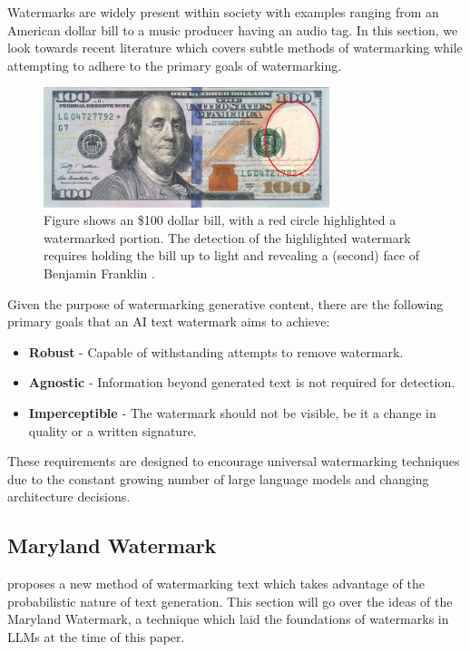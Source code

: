 \documentclass{l4proj}
\theoremstyle{definition}
\begin{document}
    Watermarks are widely present within society with examples ranging from an American dollar bill to a music producer having an audio tag. In this section, we look towards recent literature which covers subtle methods of watermarking while attempting to adhere to the primary goals of watermarking.

    \begin{figure}[ht]
        \centering
        \includegraphics[height=3.5cm, width=1\linewidth, keepaspectratio]{images/background/dbill-highlighted.png}
        \caption{Figure shows an \$100 dollar bill, with a red circle highlighted a watermarked portion. The detection of the highlighted watermark requires holding the bill up to light and revealing a (second) face of Benjamin Franklin \citep{bep2013dollar}.}
         \label{fig:dbill-watermark} 
    \end{figure}
         
    Given the purpose of watermarking generative content, there are the following primary goals that an AI text watermark aims to achieve:
    \begin{itemize}
        \setlength\itemsep{0.5em}
        \item \textbf{Robust} - Capable of withstanding attempts to remove watermark.
        \item \textbf{Agnostic} - Information beyond generated text is not required for detection.
        \item \textbf{Imperceptible} - The watermark should not be visible, be it a change in quality or a written signature.
    \end{itemize}

    These requirements are designed to encourage universal watermarking techniques due to the constant growing number of large language models and changing architecture decisions.
    
    \subsection{Maryland Watermark}
        \label{sec:maryland-watermark}
        \citet{kirchenbauer2023watermark} proposes a new method of watermarking text which takes advantage of the probabilistic nature of text generation. This section will go over the ideas of the Maryland Watermark, a technique which laid the foundations of watermarks in LLMs at the time of this paper.
\end{document}
